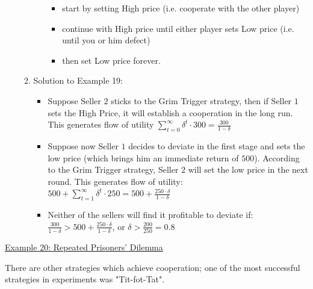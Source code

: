 \begin{enumerate}[a)]
\begin{enumerate}[c1)]
\begin{itemize}
                        \begin{itemize}
                            \item start by setting High price (i.e. cooperate with the other player)
                            \item continue with High price until either player sets Low price
                                (i.e. until you or him defect)
                            \item then set Low price forever.
                        \end{itemize}
                \end{itemize}
            \item Solution to Example 19:
                \begin{itemize}
                    \item Suppose Seller $2$ sticks to the Grim Trigger strategy,
                        then if Seller $1$ sets the High Price, it will establish
                        a cooperation in the long run. This generates flow of
                        utility $\sum_{t=0}^\infty \delta^t \cdot 300 = \frac{300}{1-\delta}$
                    \item Suppose now Seller $1$ decides to deviate in the first stage and sets the
                        low price (which brings him an immediate return of $500$). According to
                        the Grim Trigger strategy, Seller $2$ will set the low price in the next
                        round. This generates flow of utility:
                        $500 + \sum_{t=1}^\infty \delta^t \cdot 250 = 500 + \frac{250 \cdot \delta}{1 - \delta}$
                    \item Neither of the sellers will find it profitable to deviate if:
                        $\frac{300}{1 - \delta} > 500 + \frac{250 \cdot \delta}{1 - \delta}$,
                        or $\delta > \frac{200}{250} =  0.8$
                \end{itemize}
        \end{enumerate}
\end{enumerate}

\vspace{1\baselineskip}

\underline{Example 20: Repeated Prisoners' Dilemma}

There are other strategies which achieve cooperation; one of the most successful
strategies in experiments was "Tit-fot-Tat".

